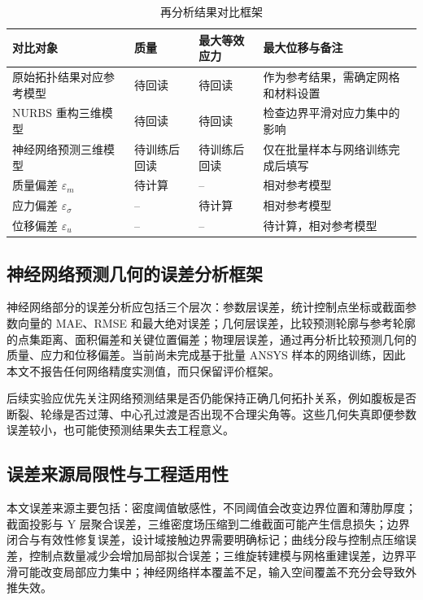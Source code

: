 \documentclass{FRB-style}
\begin{document}
\begin{table}[H]
\centering
\caption{再分析结果对比框架}
\begin{tabularx}{\textwidth}{p{}p{}p{}X}
\toprule
对比对象 & 质量 & 最大等效应力 & 最大位移与备注 \\
\midrule
原始拓扑结果对应参考模型 & 待回读 & 待回读 & 作为参考结果，需确定网格和材料设置 \\
NURBS 重构三维模型 & 待回读 & 待回读 & 检查边界平滑对应力集中的影响 \\
神经网络预测三维模型 & 待训练后回读 & 待训练后回读 & 仅在批量样本与网络训练完成后填写 \\
质量偏差 $\varepsilon_m$ & 待计算 & -- & 相对参考模型 \\
应力偏差 $\varepsilon_\sigma$ & -- & 待计算 & 相对参考模型 \\
位移偏差 $\varepsilon_u$ & -- & -- & 待计算，相对参考模型 \\
\bottomrule
\end{tabularx}
\end{table}

\subsection{神经网络预测几何的误差分析框架}

神经网络部分的误差分析应包括三个层次：参数层误差，统计控制点坐标或截面参数向量的 MAE、RMSE 和最大绝对误差；几何层误差，比较预测轮廓与参考轮廓的点集距离、面积偏差和关键位置偏差；物理层误差，通过再分析比较预测几何的质量、应力和位移偏差。当前尚未完成基于批量 ANSYS 样本的网络训练，因此本文不报告任何网络精度实测值，而只保留评价框架。

后续实验应优先关注网络预测结果是否仍能保持正确几何拓扑关系，例如腹板是否断裂、轮缘是否过薄、中心孔过渡是否出现不合理尖角等。这些几何失真即便参数误差较小，也可能使预测结果失去工程意义。

\subsection{误差来源局限性与工程适用性}

本文误差来源主要包括：密度阈值敏感性，不同阈值会改变边界位置和薄肋厚度；截面投影与 Y 层聚合误差，三维密度场压缩到二维截面可能产生信息损失；边界闭合与有效性修复误差，设计域接触边界需要明确标记；曲线分段与控制点压缩误差，控制点数量减少会增加局部拟合误差；三维旋转建模与网格重建误差，边界平滑可能改变局部应力集中；神经网络样本覆盖不足，输入空间覆盖不充分会导致外推失效。
\end{document}

